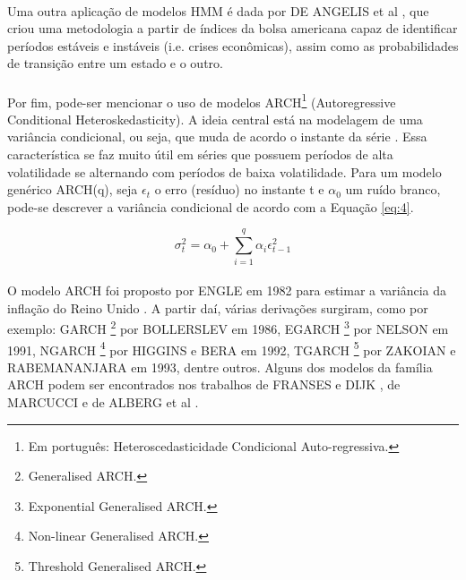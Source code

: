 \paragraph{} Uma outra aplicação de modelos HMM é dada por DE ANGELIS et al \cite{de2013dynamic}, que criou uma metodologia a partir de índices da bolsa americana capaz de identificar períodos estáveis e instáveis (i.e. crises econômicas), assim como as probabilidades de transição entre um estado e o outro.

\paragraph{} Por fim, pode-ser mencionar o uso de modelos ARCH\footnote{Em português: Heteroscedasticidade Condicional Auto-regressiva.} (Autoregressive Conditional Heteroskedasticity). A ideia central está na modelagem de uma variância condicional, ou seja, que muda de acordo o instante da série \cite{enders2008applied}. Essa característica se faz muito útil em séries que possuem períodos de alta volatilidade se alternando com períodos de baixa volatilidade. Para um modelo genérico ARCH(q), seja \begin{math}\epsilon_t\end{math} o erro (resíduo) no instante t e \begin{math}\alpha_0\end{math} um ruído branco, pode-se descrever a variância condicional de acordo com a Equação \ref{eq:4}.

\begin{equation} \label{eq:4}
\sigma_t^2 = \alpha_0 + \sum_{i=1}^{q} \alpha_i\epsilon_{t-1}^{2}
\end{equation}

\paragraph{} O modelo ARCH foi proposto por ENGLE em 1982 para estimar a variância da inflação do Reino Unido \cite{engle1982autoregressive}. A partir daí, várias derivações surgiram, como por exemplo: GARCH \footnote{Generalised ARCH.} por BOLLERSLEV \cite{bollerslev1986generalized} em 1986, EGARCH \footnote{Exponential Generalised ARCH.} por NELSON em 1991, NGARCH \footnote{Non-linear Generalised ARCH.} por HIGGINS e BERA\cite{higgins1992class} em 1992, TGARCH \footnote{Threshold Generalised ARCH.} por ZAKOIAN e RABEMANANJARA \cite{rabemananjara1993threshold} em 1993, dentre outros. Alguns dos modelos da família ARCH podem ser encontrados nos trabalhos de FRANSES e DIJK \cite{franses1996forecasting}, de MARCUCCI \cite{marcucci2005forecasting} e de ALBERG et al \cite{alberg2008estimating}.


